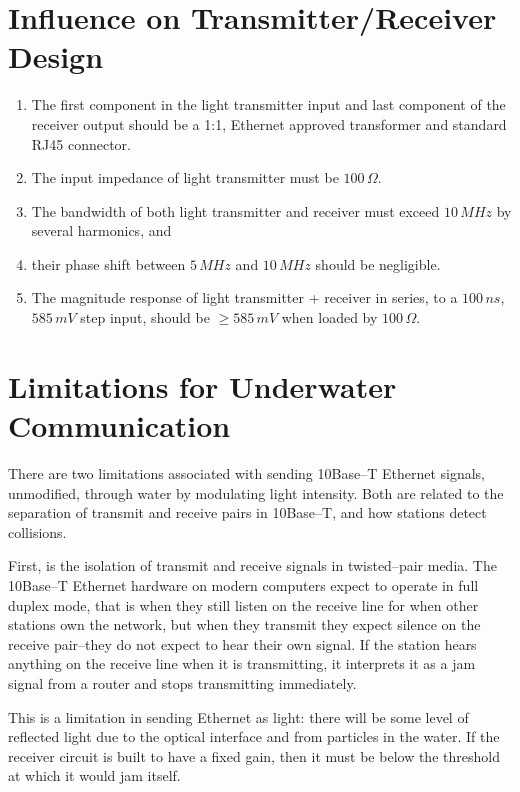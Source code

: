 \documentclass{article}
\begin{document}
\section{Influence on Transmitter/Receiver Design}

\begin{enumerate}
\item The first component in the light transmitter input
and last component of the receiver output should be a 1:1, Ethernet approved
transformer and standard RJ45 connector.
\item The input impedance of light transmitter must be $100\,\Omega$.
\item The bandwidth of both light transmitter and receiver must exceed $10\,MHz$
by several harmonics, and
\item their phase shift between $5\,MHz$ and $10\,MHz$ should be negligible.
\item The magnitude response of light transmitter + receiver in series,
to a $100\,ns$, $585\,mV$ step input, should be $\geq585\,mV$ when loaded by $100\,\Omega$.
\end{enumerate}

\section{Limitations for Underwater Communication}

There are two limitations associated with sending 10Base--T Ethernet signals,
unmodified, through water by modulating light intensity.
Both are related to the separation of transmit and receive pairs
in 10Base--T, and how stations detect collisions.

First, is the isolation of transmit and receive signals in twisted--pair media.
The 10Base--T Ethernet hardware on modern computers expect to operate in full
duplex mode, that is when they still listen on the receive line for when
other stations own the network, but when they transmit they expect silence
on the receive pair--they do not expect to hear their own signal.
If the station hears anything on the receive line when it is transmitting,
it interprets it as a jam signal from a router and stops transmitting immediately.

This is a limitation in sending Ethernet as light: there will be some
level of reflected light due to the optical interface and from particles in the water.
If the receiver circuit is built to have a fixed gain, then it must be below
the threshold at which it would jam itself.
\end{document}
